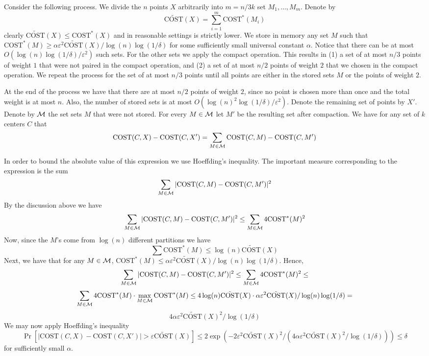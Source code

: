 \documentclass[11pt]{article}
\newcommand{\eps}{\varepsilon}
\newcommand{\cost}{\text{COST}}
\begin{document}
Consider the following process. We divide the $n$ points $X$ arbitrarily into $m=n/3k$ set $M_1,\ldots,M_m$. Denote by 
$$ \tilde{\cost}(X) = \sum_{i=1}^m \cost^*(M_i)$$
clearly $\tilde{\cost}(X) \leq \cost^*(X)$ and in reasonable settings is strictly lower. We store in memory any set $M$ such that $\cost^*(M) \geq \alpha \eps^2 \tilde{\cost}(X)/ \log(n)\log(1/\delta)$ for some sufficiently small universal constant $\alpha$. Notice that there can be at most $O(\log(n)\log(1/\delta)/\eps^2)$ such sets. For the other sets we apply the compact operation. This results in (1) a set of at most $n/3$ points of weight $1$ that were not paired in the compact operation, and (2) a set of at most $n/2$ points of weight $2$ that we chosen in the compact operation. We repeat the process for the set of at most $n/3$ points until all points are either in the stored sets $M$ or the points of weight $2$.

At the end of the process we have that there are at most $n/2$ points of weight $2$, since no point is chosen more than once and the total weight is at most $n$. Also, the number of stored sets is at most $O(\log(n)^2\log(1/\delta)/\eps^2)$. Denote the remaining set of points by $X'$. Denote by $\cal M$ the set sets $M$ that were not stored. For every $M \in {\cal M}$ let $M'$ be the resulting set after compaction. We have for any set of $k$ centers $C$ that
$$ \cost(C,X) - \cost(C,X') = \sum_{M \in {\cal M}} \cost(C,M) - \cost(C,M')  $$

In order to bound the absolute value of this expression we use Hoeffding's inequality. The important measure corresponding to the expression is the sum
$$\sum_{M \in {\cal M}} |\cost(C,M) - \cost(C,M')|^2  $$
By the discussion above we have
$$\sum_{M \in {\cal M}} |\cost(C,M) - \cost(C,M')|^2  \leq \sum_{M \in {\cal M}} 4\cost^*(M)^2  $$
Now, since the $M$'s come from $\log(n)$ different partitions we have
$$ \sum \cost^*(M) \leq \log(n) \tilde{\cost}(X) $$
Next, we have that for any $M \in {\cal M}$, $\cost^*(M) \leq  \alpha \eps^2 \tilde{\cost}(X)/\log(n) \log(1/\delta)$. Hence, 
$$\sum_{M \in {\cal M}} |\cost(C,M) - \cost(C,M')|^2  \leq \sum_{M \in {\cal M}} 4\cost^*(M)^2  \leq $$
$$\sum_{M \in {\cal M}} 4\cost^*(M) \cdot \max_{M \in {\cal M}} \cost^*(M) \leq 4\log(n) \tilde{\cost}(X) \cdot  \alpha \eps^2 \tilde{\cost}(X)/\log(n) \log(1/\delta) = $$
$$ 4 \alpha \eps^2 \tilde{\cost}(X)^2 / \log(1/\delta)$$
We may now apply Hoeffding's inequality 
$$ \Pr[|\cost(C,X) - \cost(C,X')| > \eps \tilde{\cost}(X)] \leq 2\exp(-2 \eps^2 \tilde{\cost}(X)^2 / (4 \alpha \eps^2 \tilde{\cost}(X)^2 / \log(1/\delta))) \leq \delta$$
for sufficiently small $\alpha$.
\end{document}
